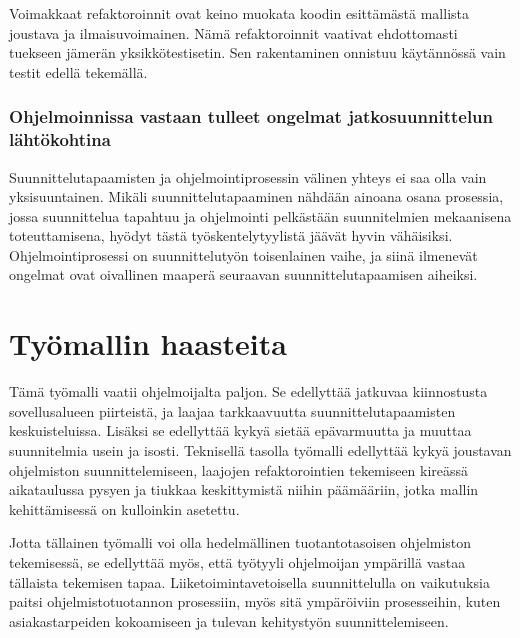 Voimakkaat refaktoroinnit ovat keino muokata koodin esittämästä mallista
joustava ja ilmaisuvoimainen. Nämä refaktoroinnit vaativat ehdottomasti
tuekseen jämerän yksikkötestisetin. Sen rakentaminen onnistuu
käytännössä vain testit edellä tekemällä.

\hypertarget{ohjelmoinnissa-vastaan-tulleet-ongelmat-jatkosuunnittelun-luxe4htuxf6kohtina}{%
\subsubsection{Ohjelmoinnissa vastaan tulleet ongelmat jatkosuunnittelun
lähtökohtina}\label{ohjelmoinnissa-vastaan-tulleet-ongelmat-jatkosuunnittelun-luxe4htuxf6kohtina}}

Suunnittelutapaamisten ja ohjelmointiprosessin välinen yhteys ei saa
olla vain yksisuuntainen. Mikäli suunnittelutapaaminen nähdään ainoana
osana prosessia, jossa suunnittelua tapahtuu ja ohjelmointi pelkästään
suunnitelmien mekaanisena toteuttamisena, hyödyt tästä
työskentelytyylistä jäävät hyvin vähäisiksi. Ohjelmointiprosessi on
suunnittelutyön toisenlainen vaihe, ja siinä ilmenevät ongelmat ovat
oivallinen maaperä seuraavan suunnittelutapaamisen aiheiksi.

\hypertarget{tyuxf6mallin-haasteita}{%
\section{Työmallin haasteita}\label{tyuxf6mallin-haasteita}}

Tämä työmalli vaatii ohjelmoijalta paljon. Se edellyttää jatkuvaa
kiinnostusta sovellusalueen piirteistä, ja laajaa tarkkaavuutta
suunnittelutapaamisten keskuisteluissa. Lisäksi se edellyttää kykyä
sietää epävarmuutta ja muuttaa suunnitelmia usein ja isosti. Teknisellä
tasolla työmalli edellyttää kykyä joustavan ohjelmiston
suunnittelemiseen, laajojen refaktorointien tekemiseen kireässä
aikataulussa pysyen ja tiukkaa keskittymistä niihin päämääriin, jotka
mallin kehittämisessä on kulloinkin asetettu.

Jotta tällainen työmalli voi olla hedelmällinen tuotantotasoisen
ohjelmiston tekemisessä, se edellyttää myös, että työtyyli ohjelmoijan
ympärillä vastaa tällaista tekemisen tapaa. Liiketoimintavetoisella
suunnittelulla on vaikutuksia paitsi ohjelmistotuotannon prosessiin,
myös sitä ympäröiviin prosesseihin, kuten asiakastarpeiden kokoamiseen
ja tulevan kehitystyön suunnittelemiseen.
